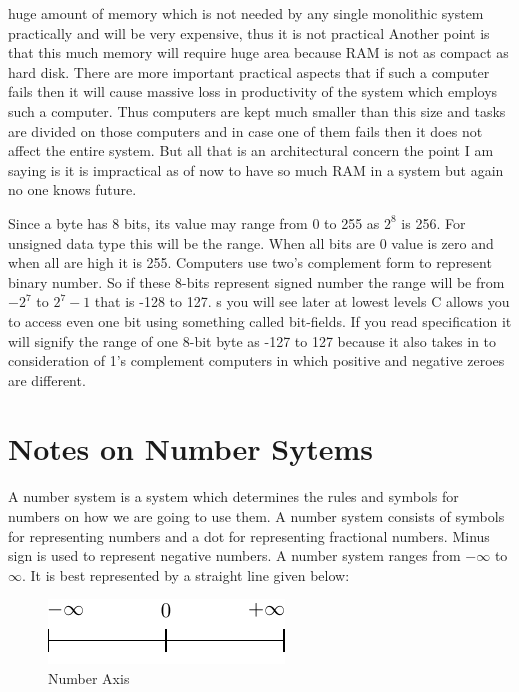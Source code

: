 huge amount of memory which is not needed by any single monolithic system
practically and will be very expensive, thus it is not practical Another point
is that this much memory will require huge area because RAM is not as compact
as hard disk. There are more important practical aspects that if such a
computer fails then it will cause massive loss in productivity of the system
which employs such a computer. Thus computers are kept much smaller than this
size and tasks are divided on those computers and in case one of them fails
then it does not affect the entire system. But all that is an architectural
concern the point I am saying is it is impractical as of now to have so much
RAM in a system but again no one knows future.

Since a byte has 8 bits, its value may range from 0 to 255 as $2^8$ is 256. For
unsigned data type this will be the range. When all bits are 0 value is zero
and when all are high it is 255. Computers use two's complement form to
represent binary number. So if these 8-bits represent signed number the range
will be from $-2^7$ to $2^7-1$ that is -128 to 127. s you will see later at
lowest levels C allows you to access even one bit using something called
bit-fields. If you read specification it will signify the range of one 8-bit
byte as -127 to 127 because it also takes in to consideration of 1’s complement
computers in which positive and negative zeroes are different.

\section{Notes on Number Sytems}
A number system is a system which determines the rules and symbols for numbers
on how we are going to use them. A number system consists of symbols for
representing numbers and a dot for representing fractional numbers. Minus sign
is used to represent negative numbers. A number system ranges from $-\infty$ to
$\infty$. It is best represented by a straight line given below:

\begin{figure}[H]
\begin{center}
\includegraphics{figs/ns.pdf}
\end{center}
\caption{Number Axis}
\end{figure}

